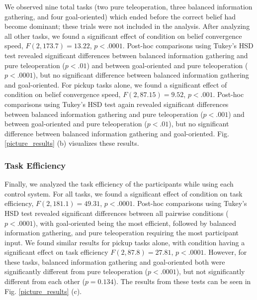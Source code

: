 \documentclass[conference]{IEEEtran}
\begin{document}
We observed nine total tasks (two pure teleoperation, three balanced information gathering, and four goal-oriented) which ended before the correct belief had become dominant; these trials were not included in the analysis.
After analyzing all other tasks, we found a significant effect of condition on belief convergence speed, $F(2, 173.7) = 13.22$, $p < .0001$. Post-hoc comparisons using Tukey's HSD test revealed significant differences between balanced information gathering and pure teleoperation ($p < .01$) and between goal-oriented and pure teleoperation ($p < .0001$), but no significant difference between balanced information gathering and goal-oriented. For pickup tasks alone, we found a significant effect of condition on belief convergence speed, $F(2, 87.15) = 9.52$, $p < .001$. Post-hoc comparisons using Tukey's HSD test again revealed significant differences between balanced information gathering and pure teleoperation ($p < .001$) and between goal-oriented and pure teleoperation ($p < .01$), but no significant difference between balanced information gathering and goal-oriented. Fig. \ref{picture_results} (b) visualizes these results.

\subsubsection{Task Efficiency}

Finally, we analyzed the task efficiency of the participants while using each control system. For all tasks, we found a significant effect of condition on task efficiency, $F(2, 181.1) = 49.31$, $p < .0001$. Post-hoc comparisons using Tukey's HSD test revealed significant differences between all pairwise conditions ($p < .0001$), with goal-oriented being the most efficient, followed by balanced information gathering, and pure teleoperation requiring the most participant input. We found similar results for pickup tasks alone, with condition having a significant effect on task efficiency $F(2, 87.8) = 27.81$, $p < .0001$. However, for these tasks, balanced information gathering and goal-oriented both were significantly different from pure teleoperation ($p < .0001$), but not significantly different from each other ($p = 0.134$). The results from these tests can be seen in Fig. \ref{picture_results} (c).
\end{document}
